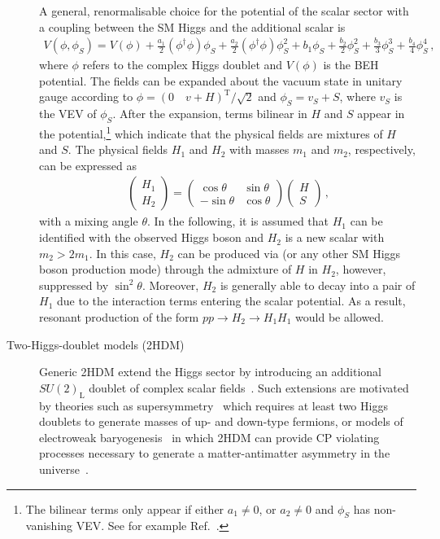 \begin{description}
  A general, renormalisable choice for the potential of the scalar sector with a
  coupling between the SM Higgs and the additional scalar
  is~\cite{OConnell:2006rsp,No:2013wsa,Chen:2014ask,DiMicco:2019ngk}
  \begin{align*}
    V(\phi, \phi_{S}) = V(\phi)
    + \frac{a_1}{2} (\phi^\dagger \phi) \phi_{S}
    + \frac{a_2}{2} (\phi^\dagger \phi) \phi_{S}^2
    + b_1 \phi_{S} + \frac{b_2}{2} \phi_{S}^2 + \frac{b_3}{3} \phi_{S}^3 + \frac{b_4}{4} \phi_{S}^4 \,\text{,}
  \end{align*}
  where $\phi$ refers to the complex Higgs doublet and $V(\phi)$ is the BEH
  potential. The fields can be expanded about the vacuum state in unitary gauge
  according to $\phi = (0 \quad v + H)^{\text{T}} / \sqrt{2}$ and
  $\phi_{S} = v_{S} + S$, where $v_{S}$ is the VEV of $\phi_{S}$. After the
  expansion, terms bilinear in $H$ and $S$ appear in the potential,\footnote{The
    bilinear terms only appear if either $a_1 \neq 0$, or $a_2 \neq 0$ and
    $\phi_{S}$ has non-vanishing VEV. See for example Ref.~\cite{Chen:2014ask}.}
  which indicate that the physical fields are mixtures of $H$ and $S$. The
  physical fields $H_1$ and $H_2$ with masses $m_1$ and $m_2$, respectively, can
  be expressed as
  \begin{align*}
    \begin{pmatrix}
      H_1 \\
      H_2
    \end{pmatrix}
    =
    \begin{pmatrix}
      \cos\theta & \sin\theta \\
      -\sin\theta & \cos\theta
    \end{pmatrix}
    \begin{pmatrix}
      H \\
      S
    \end{pmatrix} \,\text{,}
  \end{align*}
  with a mixing angle $\theta$. In the following, it is assumed that $H_1$ can
  be identified with the observed Higgs boson and $H_2$ is a new scalar with
  $m_2 > 2 m_1$. In this case, $H_2$ can be produced via \ggF (or any other SM
  Higgs boson production mode) through the admixture of $H$ in $H_2$, however,
  suppressed by $\sin^2\theta$. Moreover, $H_2$ is generally able to decay into
  a pair of $H_1$ due to the interaction terms entering the scalar potential. As
  a result, resonant production of the form $pp \to H_2 \to H_1 H_1$ would be
  allowed.


\item[Two-Higgs-doublet models (2HDM)] Generic 2HDM extend the Higgs sector by
  introducing an additional $SU(2)_{\text{L}}$ doublet of complex scalar
  fields~\cite{Branco:2011iw}. Such extensions are motivated by theories such as
  supersymmetry~\cite{Haber:1984rc} which requires at least two Higgs doublets
  to generate masses of up- and down-type fermions, or models of electroweak
  baryogenesis~\cite{Trodden:1998ym} in which 2HDM can provide CP violating
  processes necessary to generate a matter-antimatter asymmetry in the
  universe~\cite{Sakharov:1967dj}.


\end{description}
